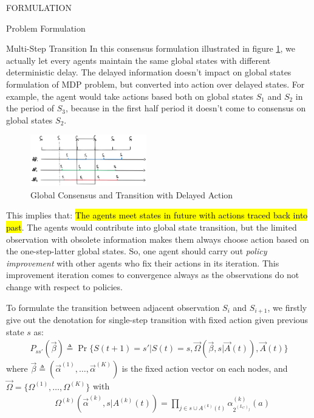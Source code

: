 \documentclass[10pt, conference, letterpaper]{IEEEtran}
\begin{document}
\begin{section}{FORMULATION}
\begin{subsection}{Problem Formulation}
\begin{subsubsection}{Multi-Step Transition}
                In this consensus formulation illustrated in figure \ref{fig:br-trans}, we actually let every agents maintain the same global states with different deterministic delay. The delayed information doesn't impact on global states formulation of MDP problem, but converted into action over delayed states. For example, the agent would take actions based both on global states $S_1$ and $S_2$ in the period of $S_3$, because in the first half period it doesn't come to consensus on global states $S_2$.

                \begin{figure}[h]
                    \centering
                    \includegraphics[width=0.45\textwidth]{broadcast-trans.png}
                    \caption{Global Consensus and Transition with Delayed Action}
                    \label{fig:br-trans}
                \end{figure}

                This implies that: \hl{The agents meet states in future with actions traced back into past}. The agents would contribute into global state transition, but the limited observation with obsolete information makes them always choose action based on the one-step-latter global states. So, one agent should carry out \emph{policy improvement} with other agents who fix their actions in its iteration. This improvement iteration comes to convergence always as the observations do not change with respect to policies.

                To formulate the transition between adjacent observation $S_i$ and $S_{i+1}$, we firstly give out the denotation for single-step transition with fixed action given previous state $s$ as:
                \begin{align}
                    P_{ss'}(\vec{\beta}) \triangleq \Pr\{ S(t+1)=s'|S(t)=s, \vec{\Omega}(\vec{\beta},s|\vec{A}(t)),\vec{A}(t) \}
                \end{align}
                where $\vec{\beta} \triangleq (\vec{\alpha}^{(1)}, \dots, \vec{\alpha}^{(K)})$ is the fixed action vector on each nodes, and $\vec{\Omega}=\{\Omega^{(1)},\dots,\Omega^{(K)}\}$ with
                \begin{align}
                    &\Omega^{(k)}(\vec{\alpha}^{(k)},s|A^{(k)}(t)) 
                    = \prod_{j \in s \cup A^{(k)}(t)} \alpha_{2^{(L_C)_j}}^{(k)}(a)
                \end{align}
                

\end{subsubsection}
\end{subsection}
\end{section}
\end{document}
